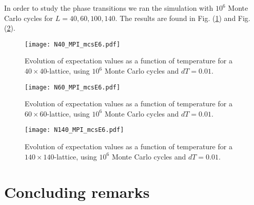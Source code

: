 \documentclass[11pt]{article}
\begin{document}
\begin{flushleft}
In order to study the phase transitions we ran the simulation with $10^6$ Monte Carlo cycles for $L=40,60,100,140$. The results are found in Fig. (\ref{fig::exp 40}) and Fig. (\ref{fig::exp 60}).


\begin{figure}[H]
\centering
\texttt{[image: N40\_MPI\_mcsE6.pdf]}
\caption{Evolution of expectation values as a function of temperature for a $40 \times 40$-lattice, using $10^6$ Monte Carlo cycles and $dT=0.01$.}
\label{fig::exp 40}
\end{figure}

\begin{figure}[H]
\centering
\texttt{[image: N60\_MPI\_mcsE6.pdf]}
\caption{Evolution of expectation values as a function of temperature for a $60 \times 60$-lattice, using $10^6$ Monte Carlo cycles and $dT=0.01$.}
\label{fig::exp 60}
\end{figure}

\begin{figure}[H]
\centering
\texttt{[image: N140\_MPI\_mcsE6.pdf]}
\caption{Evolution of expectation values as a function of temperature for a $140 \times 140$-lattice, using $10^6$ Monte Carlo cycles and $dT=0.01$.}
\end{figure}

\end{flushleft}

\section{Concluding remarks}


\nocite{*}

{}

\end{document}
